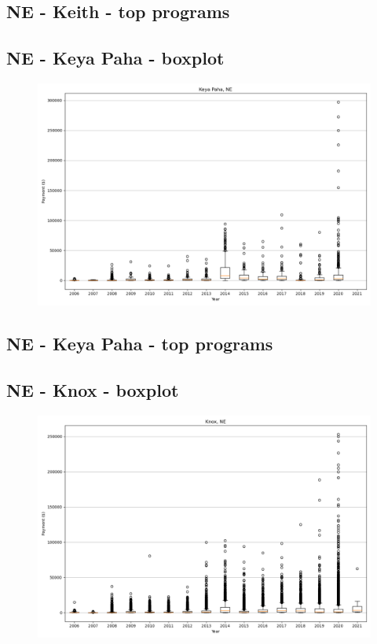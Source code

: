 \subsection*{NE - Keith - top programs}

\newpage
\subsection*{NE - Keya Paha - boxplot}
\begin{figure}[h]
\centering
\includegraphics[width=7in]{../output/boxplots/counties/Keya Paha-NE_boxplot.png}
\end{figure}


\subsection*{NE - Keya Paha - top programs}

\newpage
\subsection*{NE - Knox - boxplot}
\begin{figure}[h]
\centering
\includegraphics[width=7in]{../output/boxplots/counties/Knox-NE_boxplot.png}
\end{figure}


